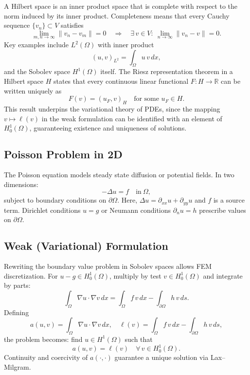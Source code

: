 A Hilbert space is an inner product space that is complete with respect to the norm induced by its inner product.  Completeness means that every Cauchy sequence $\{v_n\}\subset V$ satisfies
\begin{equation}
  \lim_{m,n\to\infty}\|v_n - v_m\| = 0
  \quad\Longrightarrow\quad
  \exists\,v\in V:\ \lim_{n\to\infty}\|v_n - v\| = 0.
\end{equation}
Key examples include $L^2(\Omega)$ with inner product
\begin{equation}
  (u,v)_{L^2} = \int_\Omega u\,v\,dx,
\end{equation}
and the Sobolev space $H^1(\Omega)$ itself.  The Riesz representation theorem in a Hilbert space $H$ states that every continuous linear functional $F:H\to\mathbb{R}$ can be written uniquely as
\begin{equation}
  F(v) = (u_F, v)_H
  \quad\text{for some }u_F\in H.
\end{equation}
This result underpins the variational theory of PDEs, since the mapping $v\mapsto\ell(v)$ in the weak formulation can be identified with an element of $H_0^1(\Omega)$, guaranteeing existence and uniqueness of solutions. \citep{Brezis2011}

\subsection{Poisson Problem in 2D}

The Poisson equation models steady state diffusion or potential fields.  In two dimensions:
\begin{equation}
  -\Delta u = f \quad \text{in}\ \Omega,
\end{equation}
subject to boundary conditions on $\partial\Omega$.  Here, $\Delta u=\partial_{xx}u+\partial_{yy}u$ and $f$ is a source term.  Dirichlet conditions $u=g$ or Neumann conditions $\partial_n u=h$ prescribe values on $\partial\Omega$. \citep{Evans2010}

\subsection{Weak (Variational) Formulation}

Rewriting the boundary value problem in Sobolev spaces allows FEM discretization.  For $u-g\in H_0^1(\Omega)$, multiply by test $v\in H_0^1(\Omega)$ and integrate by parts:
\begin{equation}
  \int_\Omega \nabla u\cdot\nabla v\,dx
  = \int_\Omega f\,v\,dx
  - \int_{\partial\Omega} h\,v\,ds.
\end{equation}
Defining
\begin{equation}
  a(u,v)=\int_\Omega\nabla u\cdot\nabla v\,dx,\quad
  \ell(v)=\int_\Omega f\,v\,dx-\int_{\partial\Omega}h\,v\,ds,
\end{equation}
the problem becomes: find $u\in H^1(\Omega)$ such that
\begin{equation}
  a(u,v)=\ell(v)\quad\forall\,v\in H_0^1(\Omega).
\end{equation}
Continuity and coercivity of $a(\cdot,\cdot)$ guarantee a unique solution via Lax–Milgram. \citep{Ciarlet1978}

